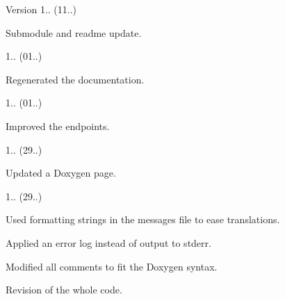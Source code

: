 \begin{DoxyVersion}{Version}
1.. (11..)
\begin{DoxyItemize}
\item Submodule and readme update. 
\end{DoxyItemize}

1.. (01..)
\begin{DoxyItemize}
\item Regenerated the documentation. 
\end{DoxyItemize}

1.. (01..)
\begin{DoxyItemize}
\item Improved the endpoints. 
\end{DoxyItemize}

1.. (29..)
\begin{DoxyItemize}
\item Updated a Doxygen page. 
\end{DoxyItemize}

1.. (29..)
\begin{DoxyItemize}
\item Used formatting strings in the messages file to ease translations.
\item Applied an error log instead of output to stderr.
\item Modified all comments to fit the Doxygen syntax.
\item Revision of the whole code. 
\end{DoxyItemize}
\end{DoxyVersion}
